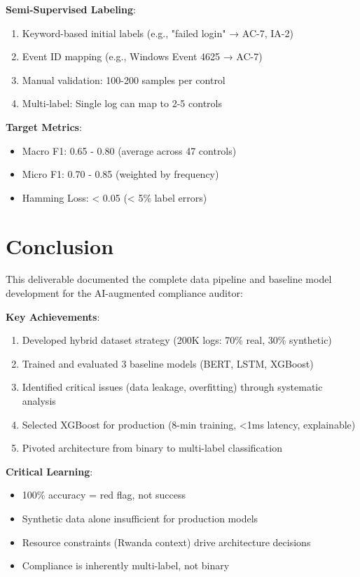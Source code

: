 \documentclass[11pt,conference]{IEEEtran}
\begin{document}
\textbf{Semi-Supervised Labeling}:
\begin{enumerate}
    \item Keyword-based initial labels (e.g., "failed login" → AC-7, IA-2)
    \item Event ID mapping (e.g., Windows Event 4625 → AC-7)
    \item Manual validation: 100-200 samples per control
    \item Multi-label: Single log can map to 2-5 controls
\end{enumerate}

\textbf{Target Metrics}:
\begin{itemize}
    \item Macro F1: 0.65 - 0.80 (average across 47 controls)
    \item Micro F1: 0.70 - 0.85 (weighted by frequency)
    \item Hamming Loss: < 0.05 (< 5\% label errors)
\end{itemize}

\section{Conclusion}

This deliverable documented the complete data pipeline and baseline model development for the AI-augmented compliance auditor:

\textbf{Key Achievements}:
\begin{enumerate}
    \item Developed hybrid dataset strategy (200K logs: 70\% real, 30\% synthetic)
    \item Trained and evaluated 3 baseline models (BERT, LSTM, XGBoost)
    \item Identified critical issues (data leakage, overfitting) through systematic analysis
    \item Selected XGBoost for production (8-min training, <1ms latency, explainable)
    \item Pivoted architecture from binary to multi-label classification
\end{enumerate}

\textbf{Critical Learning}:
\begin{itemize}
    \item 100\% accuracy = red flag, not success
    \item Synthetic data alone insufficient for production models
    \item Resource constraints (Rwanda context) drive architecture decisions
    \item Compliance is inherently multi-label, not binary
\end{itemize}
\end{document}
